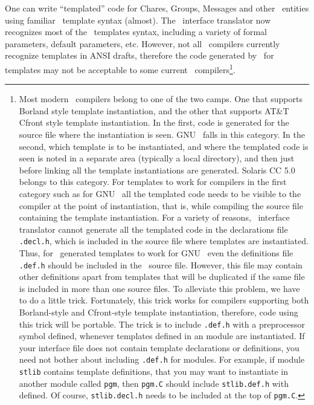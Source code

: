 One can write ``templated'' code for Chares, Groups, Messages and other 
\charmpp\  entities using familiar \CC\ template syntax (almost). The
\charmpp\ interface translator now recognizes most of the \CC\
templates syntax, including a variety of formal parameters, default
parameters, etc. However, not all \CC\ compilers currently recognize
templates in ANSI drafts, therefore the code generated by \charmpp\
for templates may not be acceptable to some current \CC\
compilers\footnote{
Most modern \CC\ compilers belong to one of the two camps. One that 
supports Borland style template instantiation, and the other that
supports AT\&T Cfront style template instantiation. In the first,
code is generated for the source file where the instantiation is seen.
GNU \CC\ falls in this category.
In the second, which template is to be instantiated, and
where the templated code is seen is noted in a separate area 
(typically a local directory), and then just before linking all the
template instantiations are generated. Solaris CC 5.0 belongs to this
category. For templates to work for compilers in the first category
such as for GNU \CC\ all the templated code needs to be visible to the
compiler at the point of instantiation, that is, while compiling the 
source file containing the template instantiation. For a variety of
reasons, \charmpp\ interface translator cannot generate all the templated
code in the declarations file {\tt *.decl.h}, which is included in the
source file where templates are instantiated. Thus, for \charmpp\ generated
templates to work for GNU \CC\ even the definitions file {\tt *.def.h}
should be included in the \CC\ source file. However, this file may
contain other definitions apart from templates that will be duplicated if
the same file is included in more than one source files. To alleviate 
this problem, we have to do a little trick. Fortunately, this trick works for
compilers supporting both Borland-style and Cfront-style template 
instantiation, therefore, code using this trick will be portable. The trick
is to include {\tt *.def.h} with a preprocessor symbol 
\kw{CK\_TEMPLATES\_ONLY} defined, whenever templates defined in an
 module are instantiated. If your
interface file does not contain template declarations or definitions,
you need not bother about including {\tt *.def.h} for \kw{extern} modules.
For example, if module {\tt stlib} contains template definitions, 
that you may want to instantiate in another module called {\tt pgm},
then {\tt pgm.C} should include {\tt stlib.def.h} 
with \kw{CK\_TEMPLATES\_ONLY} defined. Of course, {\tt stlib.decl.h} needs
to be included at the top of {\tt pgm.C}. 
}. 

